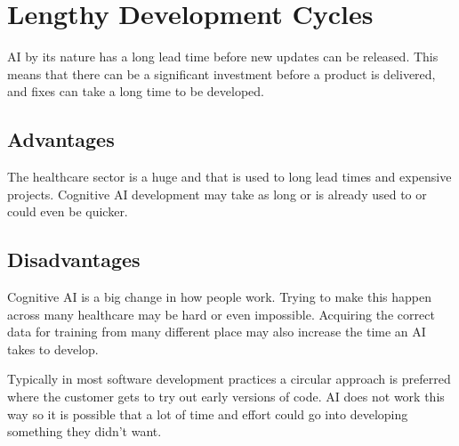 \documentclass{article}
\begin{document}
\section{Lengthy Development Cycles}
AI by its nature has a long lead time before new updates can be released. This means that there can be a significant investment before a product is delivered, and fixes can take a long time to be developed.

\subsection{Advantages}
The healthcare sector is a huge and that is used to long lead times and expensive projects. Cognitive AI development may take as long or is already used to or could even be quicker.

\subsection{Disadvantages}
Cognitive AI is a big change in how people work. Trying to make this happen across many healthcare may be hard or even impossible. Acquiring the correct data for training from many different place may also increase the time an AI takes to develop.

Typically in most software development practices a circular approach is preferred where the customer gets to try out early versions of code. AI does not work this way so it is possible that a lot of time and effort could go into developing something they didn't want.

\break

\end{document}
